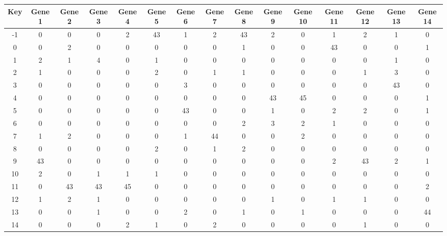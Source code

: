 \begin{tabular}{|c|c|c|c|c|c|c|c|c|c|c|c|c|c|c|}
\hline
Key & Gene 1 & Gene 2 & Gene 3 & Gene 4 & Gene 5 & Gene 6 & Gene 7 & Gene 8 & Gene 9 & Gene 10 & Gene 11 & Gene 12 & Gene 13 & Gene 14 \\
\hline
-1 & 0 & 0 & 0 & 2 & 43 & 1 & 2 & 43 & 2 & 0 & 1 & 2 & 1 & 0 \\
0 & 0 & 2 & 0 & 0 & 0 & 0 & 0 & 1 & 0 & 0 & 43 & 0 & 0 & 1 \\
1 & 2 & 1 & 4 & 0 & 1 & 0 & 0 & 0 & 0 & 0 & 0 & 0 & 1 & 0 \\
2 & 1 & 0 & 0 & 0 & 2 & 0 & 1 & 1 & 0 & 0 & 0 & 1 & 3 & 0 \\
3 & 0 & 0 & 0 & 0 & 0 & 3 & 0 & 0 & 0 & 0 & 0 & 0 & 43 & 0 \\
4 & 0 & 0 & 0 & 0 & 0 & 0 & 0 & 0 & 43 & 45 & 0 & 0 & 0 & 1 \\
5 & 0 & 0 & 0 & 0 & 0 & 43 & 0 & 0 & 1 & 0 & 2 & 2 & 0 & 1 \\
6 & 0 & 0 & 0 & 0 & 0 & 0 & 0 & 2 & 3 & 2 & 1 & 0 & 0 & 0 \\
7 & 1 & 2 & 0 & 0 & 0 & 1 & 44 & 0 & 0 & 2 & 0 & 0 & 0 & 0 \\
8 & 0 & 0 & 0 & 0 & 2 & 0 & 1 & 2 & 0 & 0 & 0 & 0 & 0 & 0 \\
9 & 43 & 0 & 0 & 0 & 0 & 0 & 0 & 0 & 0 & 0 & 2 & 43 & 2 & 1 \\
10 & 2 & 0 & 1 & 1 & 1 & 0 & 0 & 0 & 0 & 0 & 0 & 0 & 0 & 0 \\
11 & 0 & 43 & 43 & 45 & 0 & 0 & 0 & 0 & 0 & 0 & 0 & 0 & 0 & 2 \\
12 & 1 & 2 & 1 & 0 & 0 & 0 & 0 & 0 & 1 & 0 & 1 & 1 & 0 & 0 \\
13 & 0 & 0 & 1 & 0 & 0 & 2 & 0 & 1 & 0 & 1 & 0 & 0 & 0 & 44 \\
14 & 0 & 0 & 0 & 2 & 1 & 0 & 2 & 0 & 0 & 0 & 0 & 1 & 0 & 0 \\
\hline
\end{tabular}